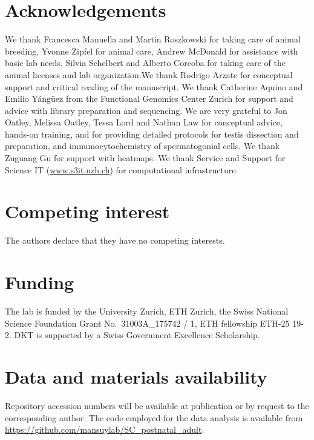 \documentclass[12pt,twoside]{reedthesis}
\begin{document}
\hypertarget{acknowledgements}{%
\section{Acknowledgements}\label{acknowledgements}}

We thank Francesca Manuella and Martin Roszkowski for taking care of
animal breeding, Yvonne Zipfel for animal care, Andrew McDonald for
assistance with basic lab needs, Silvia Schelbert and Alberto Corcoba
for taking care of the animal licenses and lab organization.We thank
Rodrigo Arzate for conceptual support and critical reading of the
manuscript. We thank Catherine Aquino and Emilio Yángüez from the
Functional Genomics Center Zurich for support and advice with library
preparation and sequencing. We are very grateful to Jon Oatley, Melissa
Oatley, Tessa Lord and Nathan Law for conceptual advice, hands-on
training, and for providing detailed protocols for testis dissection and
preparation, and immunocytochemistry of spermatogonial cells. We thank
Zuguang Gu for support with heatmaps. We thank Service and Support for
Science IT (\href{http://www.s3it.uzh.ch/}{www.s3it.uzh.ch}) for
computational infrastructure.

\hypertarget{competing-interest}{%
\section{Competing interest}\label{competing-interest}}

The authors declare that they have no competing interests.

\hypertarget{funding}{%
\section{Funding}\label{funding}}

The lab is funded by the University Zurich, ETH Zurich, the Swiss
National Science Foundation Grant No.~31003A\_175742 / 1, ETH fellowship
ETH-25 19-2. DKT is supported by a Swiss Government Excellence
Scholarship.

\hypertarget{data-and-materials-availability}{%
\section{Data and materials availability}\label{data-and-materials-availability}}

Repository accession numbers will be available at publication or by
request to the corresponding author. The code employed for the data
analysis is available from
\url{https://github.com/mansuylab/SC_postnatal_adult}.
\end{document}
